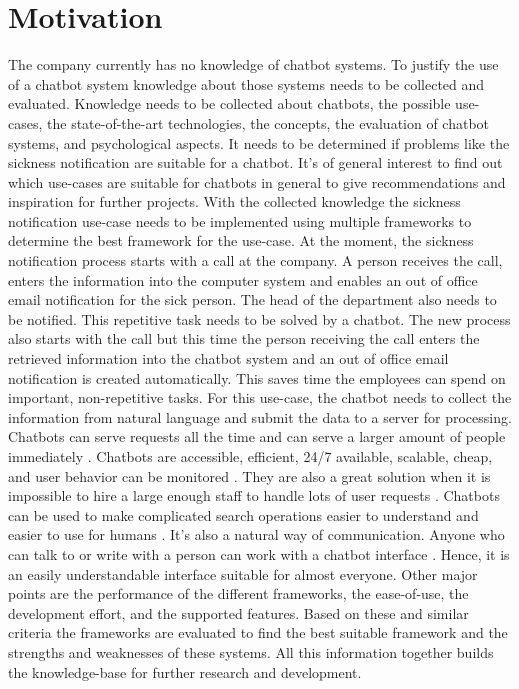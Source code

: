 \section{Motivation} %
The company currently has no knowledge of chatbot systems.
To justify the use of a chatbot system knowledge about those systems needs to be collected and evaluated.
Knowledge needs to be collected about chatbots, the possible use-cases, the state-of-the-art technologies, the concepts, 
the evaluation of chatbot systems, and psychological aspects.
It needs to be determined if problems like the sickness notification are suitable for a chatbot.
It's of general interest to find out which use-cases are suitable for chatbots in general to give
recommendations and inspiration for further projects.
With the collected knowledge the sickness notification use-case needs to be implemented using multiple frameworks to determine 
the best framework for the use-case.
At the moment, the sickness notification process starts with a call at the company. 
A person receives the call, enters the information into the computer system and enables an out of office email 
notification for the sick person. 
The head of the department also needs to be notified. 
This repetitive task needs to be solved by a chatbot. 
The new process also starts with the call but this time the person receiving the call enters 
the retrieved information into the chatbot system and an out of office email 
notification is created automatically. 
This saves time the employees can spend on important, non-repetitive tasks.
For this use-case, the chatbot needs to collect the information from natural language 
and submit the data to a server for processing.
Chatbots can serve requests all the time and can serve a larger amount of people immediately \cite{kane2016role}.
Chatbots are accessible, efficient, 24/7 available, scalable, cheap, and user behavior can be monitored \cite{buiildChatbotsPython}.
They are also a great solution when it is impossible to hire a large enough staff to handle lots of user requests \cite{kane2016role}.
Chatbots can be used to make complicated search operations easier to understand and easier to use for humans \cite{kane2016role}.
It's also a natural way of communication.
Anyone who can talk to or write with a person can work with a chatbot interface \cite{buiildChatbotsPython}.
Hence, it is an easily understandable interface suitable for almost everyone.
Other major points are the performance of the different frameworks, the ease-of-use, 
the development effort, and the supported features.
Based on these and similar criteria the frameworks are evaluated to find the best suitable 
framework and the strengths and weaknesses of these systems.
All this information together builds the knowledge-base for further research and development.

